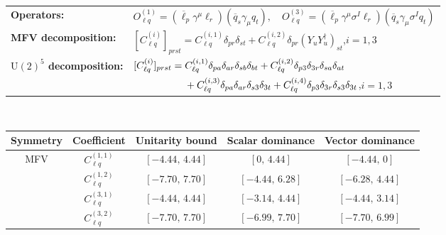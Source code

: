 \begin{table}[tbp]
\centering
{\small
\begin{tabular}{ll}
    \textbf{Operators:} &
        $\boxed{O_{\ell q}^{(1)} = (\overline\ell_p \gamma^\mu \ell_r)(\overline q_s \gamma_\mu q_t),\quad O_{\ell q}^{(3)} = (\overline\ell_p \gamma^\mu \sigma^I \ell_r)(\overline q_s \gamma_\mu \sigma^I q_t)}$ \\[0.2cm]
    \textbf{MFV decomposition:} &
        $[C_{\ell q}^{(i)}]_{prst} =
            C_{\ell q}^{(i,1)}\delta_{pr}\delta_{st}
            + C_{\ell q}^{(i,2)}\delta_{pr}(Y_u Y_u^\dagger)_{st}$,\quad $i=1,3$ \\[0.15cm]
    \textbf{$\mathrm{U}(2)^5$ decomposition:} &
        $[C_{\ell q}^{(i)}]_{prst} =
            C_{\ell q}^{(i,1)}\Pij{p}{r}{a}\Pij{s}{t}{b}
            + C_{\ell q}^{(i,2)}\delta_{p3}\delta_{3r}\Pij{s}{t}{a}
            $ \\
        & $\phantom{[C_{\ell q}^{(i)}]_{prst} ={}}+ C_{\ell q}^{(i,3)}\Pij{p}{r}{a}\delta_{s3}\delta_{3t}
            + C_{\ell q}^{(i,4)}\delta_{p3}\delta_{3r}\delta_{s3}\delta_{3t}$,\quad $i=1,3$ \\
\end{tabular}
\\[0.3cm]
\renewcommand{\arraystretch}{1.3}
\begin{tabular}{ccccc}
    \toprule
    \rowcolor{hdrcolor}
    \textbf{Symmetry} & \textbf{Coefficient}
        & \textbf{Unitarity bound}
        & \textbf{Scalar dominance}
        & \textbf{Vector dominance} \\
    \midrule
    \multirow{4}{*}{MFV}
        & $C_{\ell q}^{(1,1)}$ & $[-4.44,\, 4.44]$ & $[0,\, 4.44]$      & $[-4.44,\, 0]$    \\
        & $C_{\ell q}^{(1,2)}$ & $[-7.70,\, 7.70]$ & $[-4.44,\, 6.28]$  & $[-6.28,\, 4.44]$ \\
        & $C_{\ell q}^{(3,1)}$ & $[-4.44,\, 4.44]$ & $[-3.14,\, 4.44]$  & $[-4.44,\, 3.14]$ \\
        & $C_{\ell q}^{(3,2)}$ & $[-7.70,\, 7.70]$ & $[-6.99,\, 7.70]$  & $[-7.70,\, 6.99]$ \\
    \midrule

\end{tabular}}
\end{table}
